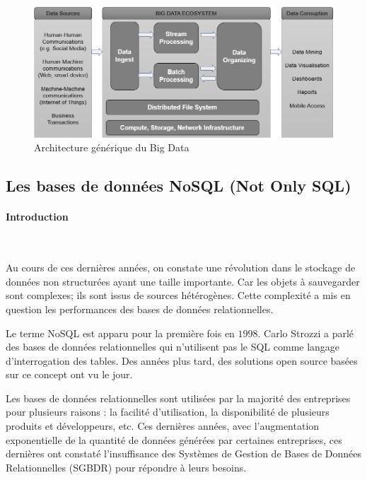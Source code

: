 		
		
	
		\begin{figure}[H]
			\captionsetup{justification = centering}
			\centering
			\includegraphics[width=1\linewidth]{illustrations/bigdata-architecture}
			\caption{Architecture générique du Big Data \cite{anil-big-data}}
			\label{fig:bigdata-architecture}
			
		\end{figure}

	
	\subsection{Les bases de données NoSQL (Not Only SQL) } \label{sec:nosql}
	
	
	\paragraph{Introduction } ~
	
    Au cours de ces dernières années, on constate une révolution dans le stockage de données non structurées ayant une taille importante.  Car les objets à sauvegarder sont complexes; ils sont issus de sources hétérogènes.  Cette complexité a mis en question les performances des bases de données relationnelles. 
	
	Le terme NoSQL est apparu pour la première fois en $ 1998 $. Carlo Strozzi  a parlé des bases de données relationnelles qui n'utilisent pas le SQL comme langage d'interrogation des tables. Des années plus tard, des solutions  open source basées sur ce concept ont vu le jour. 
	
	Les bases de données relationnelles sont utilisées par la majorité des entreprises pour plusieurs raisons :   la facilité d'utilisation, la disponibilité de plusieurs produits et développeurs, etc. Ces dernières années, avec l'augmentation exponentielle de la quantité de données générées par certaines entreprises, ces dernières ont constaté l'insuffisance des Systèmes de Gestion de Bases de Données Relationnelles (SGBDR) pour répondre à leurs besoins.
	
